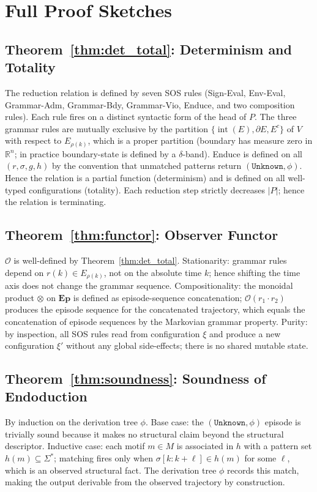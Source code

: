 \documentclass[11pt,a4paper]{article}
\theoremstyle{plain}
\theoremstyle{definition}
\theoremstyle{remark}
\DeclareMathOperator{\interior}{int}
\newcommand{\R}{\mathbb{R}}
\newcommand{\Ep}{\mathbf{Ep}}
\newcommand{\Obs}{\mathcal{O}}
\begin{document}
\section{Full Proof Sketches}
\label{app:proofs}

\subsection*{Theorem~\ref{thm:det_total}: Determinism and Totality}
The reduction relation is defined by seven SOS rules (Sign-Eval, Env-Eval, Grammar-Adm,
Grammar-Bdy, Grammar-Vio, Enduce, and two composition rules). Each rule fires on a distinct
syntactic form of the head of $P$. The three grammar rules are mutually exclusive by the
partition $\{\interior(E), \partial E, E^c\}$ of $V$ with respect to $E_{\rho(k)}$, which is a
proper partition (boundary has measure zero in $\R^n$; in practice boundary-state is
defined by a $\delta$-band). Enduce is defined on all $(r, \sigma, g, h)$ by the convention
that unmatched patterns return $(\mathtt{Unknown}, \phi)$. Hence the relation is a partial
function (determinism) and is defined on all well-typed configurations (totality). Each
reduction step strictly decreases $|P|$; hence the relation is terminating.

\subsection*{Theorem~\ref{thm:functor}: Observer Functor}
$\Obs$ is well-defined by Theorem~\ref{thm:det_total}. Stationarity: grammar rules depend on
$r(k) \in E_{\rho(k)}$, not on the absolute time $k$; hence shifting the time axis does not
change the grammar sequence. Compositionality: the monoidal product $\otimes$ on $\Ep$ is
defined as episode-sequence concatenation; $\Obs(r_1 \cdot r_2)$ produces the episode sequence
for the concatenated trajectory, which equals the concatenation of episode sequences by the
Markovian grammar property. Purity: by inspection, all SOS rules read from configuration
$\xi$ and produce a new configuration $\xi'$ without any global side-effects; there is no
shared mutable state.

\subsection*{Theorem~\ref{thm:soundness}: Soundness of Endoduction}
By induction on the derivation tree $\phi$. Base case: the $(\mathtt{Unknown}, \phi)$ episode
is trivially sound because it makes no structural claim beyond the structural descriptor.
Inductive case: each motif $m \in M$ is associated in $h$ with a pattern set
$h(m) \subseteq \Sigma^*$; matching fires only when $\sigma[k:k+\ell] \in h(m)$ for some
$\ell$, which is an observed structural fact. The derivation tree $\phi$ records this match,
making the output derivable from the observed trajectory by construction.
\end{document}
